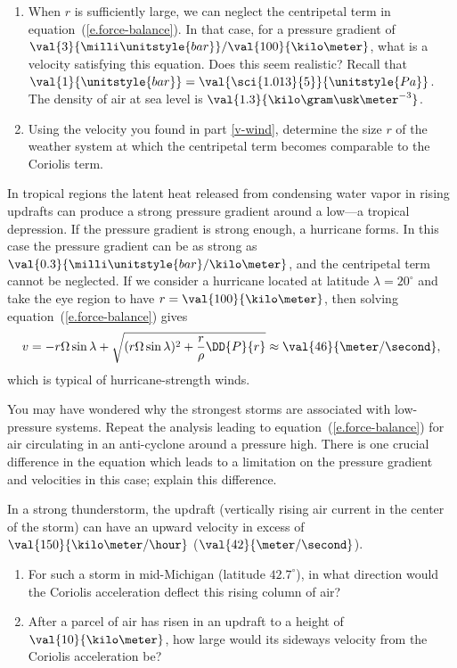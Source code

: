 \begin{exercisebox}
\begin{enumerate}
\renewcommand{\theenumi}{\alph{enumi}}
\renewcommand{\labelenumi}{\alph{enumi})}
\item\label{v-wind}
When $r$ is sufficiently large, we can neglect the centripetal term in equation~(\ref{e.force-balance}).  In that case, for a pressure gradient of $\val{3}{\milli\unitstyle{bar}}/\val{100}{\kilo\meter}$, what is a velocity satisfying this equation. Does this seem realistic? Recall that $\val{1}{\unitstyle{bar}} = \val{\sci{1.013}{5}}{\unitstyle{Pa}}$.  The density of air at sea level is $\val{1.3}{\kilo\gram\usk\meter^{-3}}$.

\item Using the velocity you found in part \ref{v-wind}, determine the size $r$ of the weather system at which the centripetal term becomes comparable to the Coriolis term.
\end{enumerate}
\end{exercisebox}

In tropical regions the latent heat released from condensing water vapor in rising updrafts can produce a strong pressure gradient around a low---a tropical depression. If the pressure gradient is strong enough, a hurricane forms. In this case the pressure gradient can be as strong as $\val{0.3}{\milli\unitstyle{bar}/\kilo\meter}$, and the centripetal term cannot be neglected.
If we consider a hurricane located at  latitude $\lambda=20^{\circ}$ and take the eye region to have $r = \val{100}{\kilo\meter}$, then solving equation~(\ref{e.force-balance}) gives
\[
	v = -r\Omega\sin\lambda + \sqrt{(r\Omega\sin\lambda)^{2}+\frac{r}{\rho}\DD{P}{r}}\approx \val{46}{\meter/\second},
\]
which is typical of hurricane-strength winds.

\begin{exercisebox}
You may have wondered why the strongest storms are associated with low-pressure systems. Repeat the analysis leading to equation~(\ref{e.force-balance}) for air circulating in an anti-cyclone around a pressure high. There is one crucial difference in the equation which leads to a limitation on the pressure gradient and velocities in this case; explain this difference.
\end{exercisebox}

\begin{exercisebox}
In a strong thunderstorm, the updraft (vertically rising air current in the center of the storm) can have an upward velocity in excess of $\val{150}{\kilo\meter/\hour}$ ($\val{42}{\meter/\second}$). 
\begin{enumerate}
\item
For such a storm in mid-Michigan (latitude $42.7^{\circ}$), in what direction would the Coriolis acceleration deflect this rising column of air?
\item
After a parcel of air has risen in an updraft to a height of $\val{10}{\kilo\meter}$, how large would its sideways velocity from the Coriolis acceleration be?
\end{enumerate}
\end{exercisebox}